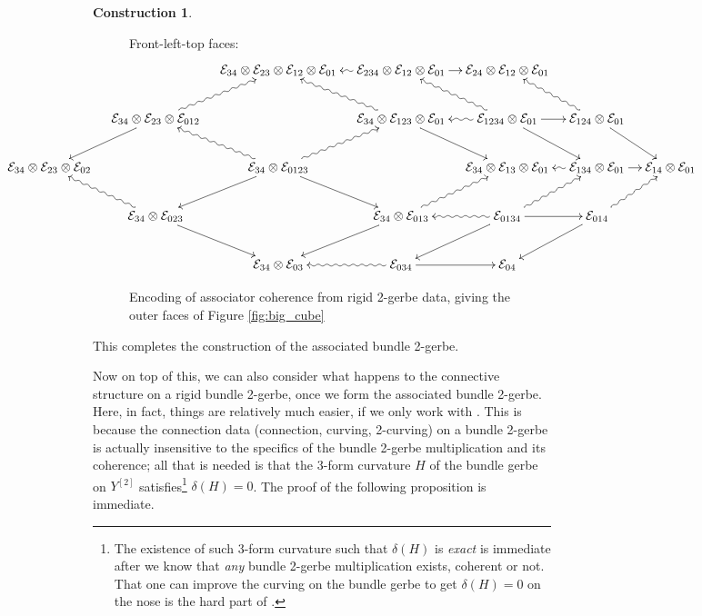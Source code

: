 \documentclass[12pt]{amsart}
\theoremstyle{plain}
\theoremstyle{definition}
\newtheorem{construction}[theorem]{Construction}
\theoremstyle{remark}
\numberwithin{equation}{section}
\newcommand{\cE}{{\mathcal E}}
\newcommand{\<}{\langle}
\renewcommand{\>}{\rangle}
\begin{document}
\begin{construction}
\begin{enumerate}
\begin{figure}
\noindent Front-left-top faces:
{\scriptsize
\[
	\centerline{
	\xymatrix@C=1em{
		&& \cE_{34}\otimes\cE_{23}\otimes\cE_{12}\otimes \cE_{01} & \ar@{~>}[l] \cE_{234}\otimes\cE_{12}\otimes \cE_{01} \ar[r] & \cE_{24}\otimes\cE_{12}\otimes \cE_{01} \\
		& \ar[dl] \cE_{34}\otimes \cE_{23}\otimes \cE_{012} \ar@{~>}[ur] &&  \ar@{~>}[ul] \cE_{34}\otimes \cE_{123}\otimes \cE_{01} \ar[dr] & \ar@{~>}[l] \ar@{~>}[ul] \cE_{1234}\otimes \cE_{01} \ar[r] \ar[dr] & \ar@{~>}[ul] \cE_{124}\otimes \cE_{01} \ar[dr]\\
		\cE_{34}\otimes\cE_{23}\otimes \cE_{02} && \ar@{~>}[ul] \ar[dl] \cE_{34}\otimes \cE_{0123} \ar@{~>}[ur] \ar[dr] && \cE_{34}\otimes \cE_{13}\otimes \cE_{01} & \ar@{~>}[l] \cE_{134}\otimes \cE_{01} \ar[r] & \cE_{14}\otimes \cE_{01}\\
		& \ar@{~>}[ul] \cE_{34}\otimes\cE_{023} \ar[dr] && \ar[dl] \cE_{34}\otimes \cE_{013} \ar@{~>}[ur] & \ar@{~>}[l] \ar[dl] \cE_{0134} \ar@{~>}[ur] \ar[r] & \ar[dl] \cE_{014} \ar@{~>}[ur]\\
		&& \cE_{34}\otimes\cE_{03} & \ar@{~>}[l] \cE_{034} \ar[r] & \cE_{04} 
	}
	}
\]}\medskip

\caption{Encoding of associator coherence from rigid 2-gerbe data, giving the outer faces of Figure \ref{fig:big_cube}}\label{fig:cut open associator cube}
\end{figure}

\end{enumerate}

\noindent
This completes the construction of the associated bundle 2-gerbe.

\end{construction}

Now on top of this, we can also consider what happens to the connective structure on a rigid bundle 2-gerbe, once we form the associated bundle 2-gerbe. Here, in fact, things are relatively much easier, if we only work with \cite[Definition 8.1]{Ste}.
This is because the connection data (connection, curving, 2-curving) on a bundle 2-gerbe is actually insensitive to the specifics of the bundle 2-gerbe multiplication and its coherence; all that is needed is that the 3-form curvature $H$ of the bundle gerbe on $Y^{[2]}$ satisfies\footnote{The existence of such 3-form curvature such that $\delta(H)$ is \emph{exact} is immediate after we know that \emph{any} bundle 2-gerbe multiplication exists, coherent or not.
That one can improve the curving on the bundle gerbe to get $\delta(H)=0$ on the nose is the hard part of \cite[Chapter 10]{StevPhD}.} $\delta(H)=0$.
The proof of the following proposition is immediate.
\end{document}
